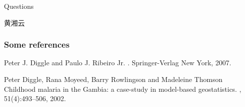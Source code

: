 \documentclass[aspectratio=43,11pt,unknownkeysallowed,UTF8]{beamer}
\begin{document}
\begin{frame}{Questions}

  \vspace{6.3cm}
  \begin{flushright}
    黄湘云

  \end{flushright}
\end{frame}

\appendix

\begin{frame}[allowframebreaks]
  \frametitle{Some references}
  \begin{thebibliography}{10}
    
  \beamertemplatebookbibitems

    Peter J. Diggle and Paulo J. {Ribeiro Jr}.
    .
    \newblock Springer-Verlag New York, 2007.
 
  \beamertemplatearticlebibitems

    Peter Diggle, Rana Moyeed, Barry Rowlingson and Madeleine Thomson
    \newblock Childhood malaria in the Gambia: a case-study in model-based geostatistics.
    , 51(4):493--506,
    2002.
  \end{thebibliography}
\end{frame}
\end{document}
